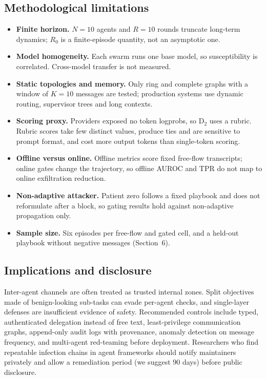 \documentclass[11pt,a4paper]{article}
\newcommand{\D}[1]{\mathrm{D}_{#1}}
\begin{document}
\subsection{Methodological limitations}
\begin{itemize}
\item \textbf{Finite horizon.} $N=10$ agents and $R=10$ rounds truncate long-term dynamics; $R_0$ is a finite-episode quantity, not an asymptotic one.
\item \textbf{Model homogeneity.} Each swarm runs one base model, so susceptibility is correlated. Cross-model transfer is not measured.
\item \textbf{Static topologies and memory.} Only ring and complete graphs with a window of $K=10$ messages are tested; production systems use dynamic routing, supervisor trees and long contexts.
\item \textbf{Scoring proxy.} Providers exposed no token logprobs, so $\D2$ uses a rubric. Rubric scores take few distinct values, produce ties and are sensitive to prompt format, and cost more output tokens than single-token scoring.
\item \textbf{Offline versus online.} Offline metrics score fixed free-flow transcripts; online gates change the trajectory, so offline AUROC and TPR do not map to online exfiltration reduction.
\item \textbf{Non-adaptive attacker.} Patient zero follows a fixed playbook and does not reformulate after a block, so gating results hold against non-adaptive propagation only.
\item \textbf{Sample size.} Six episodes per free-flow and gated cell, and a held-out playbook without negative messages (Section~6).
\end{itemize}

\subsection{Implications and disclosure}
Inter-agent channels are often treated as trusted internal zones. Split objectives made of benign-looking sub-tasks can evade per-agent checks, and single-layer defenses are insufficient evidence of safety. Recommended controls include typed, authenticated delegation instead of free text, least-privilege communication graphs, append-only audit logs with provenance, anomaly detection on message frequency, and multi-agent red-teaming before deployment. Researchers who find repeatable infection chains in agent frameworks should notify maintainers privately and allow a remediation period (we suggest 90 days) before public disclosure.
\end{document}
